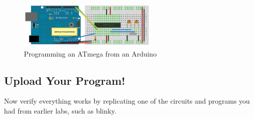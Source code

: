 \documentclass{article}
\begin{document}
\begin{figure}[!h]
    \center
    \includegraphics[width=0.6\textwidth,keepaspectratio]{ArduinoUSBSerial}
    \caption{Programming an ATmega from an Arduino}
    \label{img:ArduinoUSBSerial}
\end{figure}

\subsection{Upload Your Program!}
Now verify everything works by replicating one of the circuits and programs you had from earlier labs, such as blinky.
\end{document}
